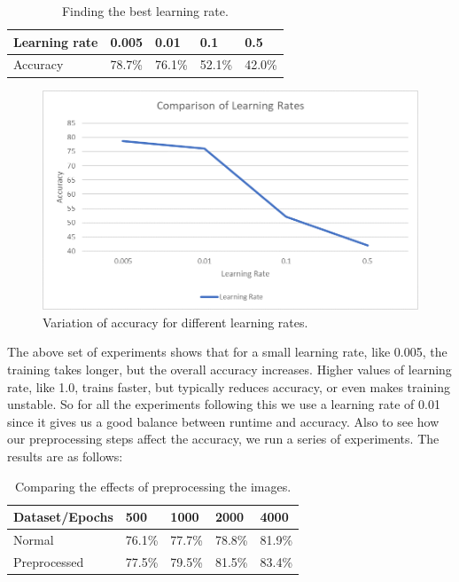 \documentclass[12pt]{report}
\begin{document}
\begin{table}[H]
\begin{center}
\begin{tabular}{ |p{5cm}|p{2cm}|p{2cm}|p{2cm}|p{2cm}| }
 \hline
 Learning rate & 0.005 & 0.01 & 0.1 & 0.5\\ 
 \hline
 Accuracy &   78.7\%&  76.1\% &   52.1\% &  42.0\%\\   
 \hline
\end{tabular}
\caption{Finding the best learning rate.}
\end{center}
\end{table}

\begin{figure}[h]
\centering
\includegraphics[width=1\textwidth]{Paint2}
\caption{Variation of accuracy for different learning rates.}
\label{fig:test10}
\end{figure}

\noindent The above set of experiments shows that for a small learning rate, like 0.005, the training takes longer, but the overall accuracy increases. Higher values of learning rate, like 1.0, trains faster, but typically reduces accuracy, or even makes training unstable. So for all the experiments following this we use a learning rate of 0.01 since it gives us a good balance between runtime and accuracy. Also to see how our preprocessing steps affect the accuracy, we run a series of experiments. The results are as follows:

\begin{table}[H]
\begin{center}
\begin{tabular}{ |p{5cm}|p{2cm}|p{2cm}|p{2cm}|p{2cm}| }
 \hline
 Dataset/Epochs & 500 & 1000 & 2000 & 4000\\ 
 \hline
 Normal &  76.1\% &  77.7\% &  78.8\% &  81.9\%\\ 
 \hline
 Preprocessed & 77.5\% &  79.5\% &  81.5\% & 83.4\%\\   
 \hline
\end{tabular}
\caption{Comparing the effects of preprocessing the images.}
\end{center}
\end{table}
\end{document}
